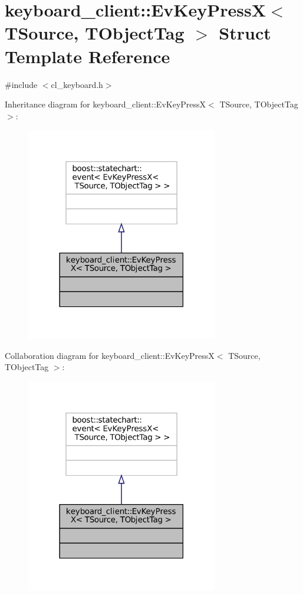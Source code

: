 \hypertarget{structkeyboard__client_1_1EvKeyPressX}{}\section{keyboard\+\_\+client\+:\+:Ev\+Key\+PressX$<$ T\+Source, T\+Object\+Tag $>$ Struct Template Reference}
\label{structkeyboard__client_1_1EvKeyPressX}


{\ttfamily \#include $<$cl\+\_\+keyboard.\+h$>$}



Inheritance diagram for keyboard\+\_\+client\+:\+:Ev\+Key\+PressX$<$ T\+Source, T\+Object\+Tag $>$\+:
\nopagebreak
\begin{figure}[H]
\begin{center}
\leavevmode
\includegraphics[width=237pt]{structkeyboard__client_1_1EvKeyPressX__inherit__graph}
\end{center}
\end{figure}


Collaboration diagram for keyboard\+\_\+client\+:\+:Ev\+Key\+PressX$<$ T\+Source, T\+Object\+Tag $>$\+:
\nopagebreak
\begin{figure}[H]
\begin{center}
\leavevmode
\includegraphics[width=237pt]{structkeyboard__client_1_1EvKeyPressX__coll__graph}
\end{center}
\end{figure}


